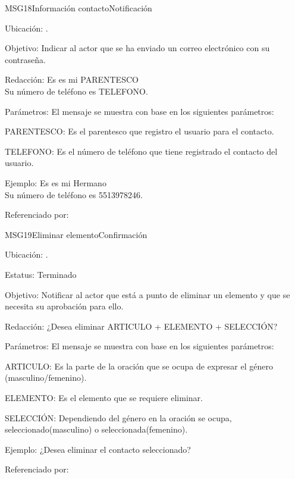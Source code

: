 \begin{mensaje}{MSG18}{Información contacto}{Notificación}
	\item[Ubicación:] \msjEmergente.
	\item[Objetivo:] Indicar al actor que se ha enviado un correo electrónico con su contraseña.
	\item[Redacción:] Es es mi PARENTESCO \\
	Su número de teléfono es TELEFONO.
	\item[Parámetros:] El mensaje se muestra con base en los siguientes parámetros:
	\begin{Citemize}
		\item PARENTESCO: Es el parentesco que registro el usuario para el contacto.
		\item TELEFONO: Es el número de teléfono que tiene registrado el contacto del usuario.
	\end{Citemize}
	\item[Ejemplo:] Es es mi Hermano \\
	Su número de teléfono es 5513978246.
	\item[Referenciado por:] 
\end{mensaje}

\begin{mensaje}{MSG19}{Eliminar elemento}{Confirmación}
	\item[Ubicación:] \msjEmergente.
	\item[Estatus:] Terminado
	\item[Objetivo:] Notificar al actor que está a punto de eliminar un elemento y que se necesita su aprobación para ello.
	\item[Redacción:] ¿Desea eliminar ARTICULO + ELEMENTO + SELECCIÓN?
	\item[Parámetros:] El mensaje se muestra con base en los siguientes parámetros:
	\begin{Citemize} 
		\item ARTICULO: Es la parte de la oración que se ocupa de expresar el género (masculino/femenino).
		\item ELEMENTO: Es el elemento que se requiere eliminar.
		\item SELECCIÓN: Dependiendo del género en la oración se ocupa, seleccionado(masculino) o seleccionada(femenino).
	\end{Citemize}
	\item[Ejemplo:] ¿Desea eliminar el contacto seleccionado?
	\item[Referenciado por:] 
\end{mensaje}